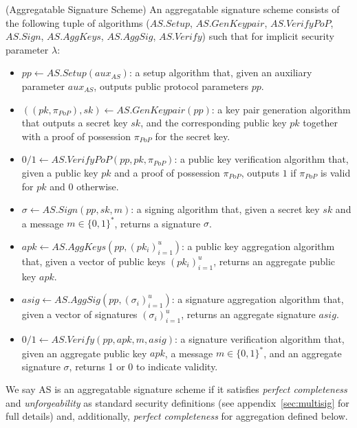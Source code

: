 \begin{definition}
\label{def:aggregate_signatures}
(Aggregatable Signature Scheme) An aggregatable signature scheme consists of
the following tuple of algorithms ($\mathit{AS.Setup}$, $\mathit{AS.GenKeypair}$, $\mathit{AS.VerifyPoP}$, 
$\mathit{AS.Sign}$, $\mathit{AS.AggKeys}$, $\mathit{AS.AggSig}$, $\mathit{AS.Verify}$) 
such that for implicit security parameter $\lambda$:
\vspace{-0.05in}
\begin{itemize}

\item $\mathit{pp} \leftarrow  \mathit{AS.Setup}(\mathit{aux_{\mathit{AS}}})$: a setup algorithm that, given an 
auxiliary parameter $\mathit{aux_{\mathit{AS}}}$, outputs public protocol parameters $\mathit{pp}$. 

\item $((\mathit{pk},\mathit{\pi_{PoP}}),\mathit{sk}) \leftarrow \mathit{AS.GenKeypair}(\mathit{pp})$:
a key pair generation algorithm that
outputs 
a secret key $\mathit{sk}$,
and the corresponding public key $\mathit{pk}$
together with a proof of possession $\mathit{\pi_{PoP}}$ for the secret key.

\item $0/1 \leftarrow \mathit{AS.VerifyPoP}(\mathit{pp}, \mathit{pk},\mathit{\pi_{PoP}})$:
a public key verification algorithm that,
given a public key $\mathit{pk}$
and a proof of possession $\mathit{\pi_{PoP}}$,
outputs
$1$ if $\mathit{\pi_{PoP}}$ is valid for $\mathit{pk}$ and $0$ otherwise.

\item $\sigma \leftarrow \mathit{AS.Sign}(\mathit{pp}, \mathit{sk}, m)$:
a signing algorithm that,
given a secret key $\mathit{sk}$ and a message $m \in \{0, 1\}^*$, returns a signature $\sigma$.

\item $\mathit{apk} \leftarrow \mathit{AS.AggKeys}(\mathit{pp}, (\mathit{pk_i})_{i=1}^{u})$:
a public key aggregation algorithm that,
given a vector of public keys $(\mathit{pk_i})_{i=1}^u$,
returns
an aggregate public key $\mathit{apk}$.

\item $\mathit{asig} \leftarrow \mathit{AS.AggSig}(\mathit{pp}, (\sigma_i)_{i=1}^u)$:
a signature aggregation algorithm that,
given a vector of signatures $(\sigma_i)_{i=1}^u$,
returns
an aggregate signature $\mathit{asig}$.

\item $0/1 \leftarrow \mathit{AS.Verify}(\mathit{pp}, \mathit{apk}, m, \mathit{asig})$:
a signature verification algorithm that,
given an aggregate public key $\mathit{apk}$, a message $m \in \{0, 1\}^*$, and an aggregate signature $\sigma$,
returns
1 or 0 to indicate validity.
\end{itemize}
\vspace{-0.07in}
\noindent We say AS is an aggregatable signature scheme if it satisfies \emph{perfect completeness} and \emph{unforgeability} 
as standard security definitions (see appendix~\ref{sec:multisig} for full details) 
and, additionally, \emph{perfect completeness} for aggregation defined below.
\end{definition}

